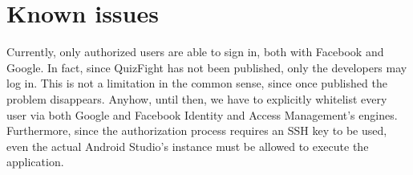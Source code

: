\section{Known issues}\label{sec:issues}
Currently, only authorized users are able to sign in, both with Facebook and
Google. In fact, since QuizFight has not been published, only the developers
may log in. This is not a limitation in the common sense, since once published
the problem disappears. Anyhow, until then, we have to explicitly whitelist
every user via both Google and Facebook Identity and Access Management's engines.
Furthermore, since the authorization process requires an SSH key to be used, 
even the actual Android Studio's instance must be allowed to execute
the application. 


